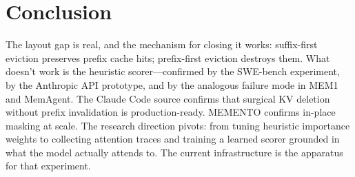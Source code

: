 \documentclass[letterpaper,twocolumn,10pt]{article}
\begin{document}
\section{Conclusion}

The layout gap is real, and the mechanism for closing it works: suffix-first
eviction preserves prefix cache hits; prefix-first eviction destroys them.
What doesn't work is the heuristic scorer---confirmed by the SWE-bench
experiment, by the Anthropic API prototype, and by the analogous failure mode
in MEM1 and MemAgent. The Claude Code source confirms that surgical KV
deletion without prefix invalidation is production-ready. MEMENTO confirms
in-place masking at scale. The research direction pivots: from tuning heuristic
importance weights to collecting attention traces and training a learned scorer
grounded in what the model actually attends to. The current infrastructure is
the apparatus for that experiment.



\end{document}
